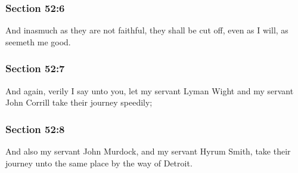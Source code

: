 	\subsubsection{Section 52:6} %
		\label{DC52-6}

		And inasmuch as they are not faithful, they shall be cut off, even as I will, as seemeth me good.


	\subsubsection{Section 52:7} %
		\label{DC52-7}

		And again, verily I say unto you, let my servant Lyman Wight and my servant John Corrill take their journey speedily;


	\subsubsection{Section 52:8} %
		\label{DC52-8}

		And also my servant John Murdock, and my servant Hyrum Smith, take their journey unto the same place by the way of Detroit.



